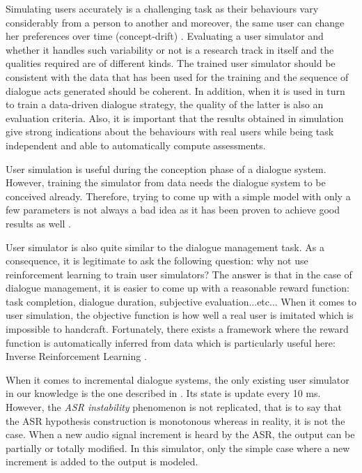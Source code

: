        	Simulating users accurately is a challenging task as their behaviours vary considerably from a person to another and moreover, the same user can change her preferences over time (concept-drift) \cite{Schatzmann2006}. Evaluating a user simulator and whether it handles such variability or not is a research track in itself \cite{Pietquin2013} and the qualities required are of different kinds. The trained user simulator should be consistent with the data that has been used for the training and the sequence of dialogue acts generated should be coherent. In addition, when it is used in turn to train a data-driven dialogue strategy, the quality of the latter is also an evaluation criteria. Also, it is important that the results obtained in simulation give strong indications about the behaviours with real users while being task independent and able to automatically compute assessments.
        
        User simulation is useful during the conception phase of a dialogue system. However, training the simulator from data needs the dialogue system to be conceived already. Therefore, trying to come up with a simple model with only a few parameters is not always a bad idea as it has been proven to achieve good results as well \cite{Schatzmann2007}.
        
        User simulator is also quite similar to the dialogue management task. As a consequence, it is legitimate to ask the following question: why not use reinforcement learning to train user simulators? The answer is that in the case of dialogue management, it is easier to come up with a reasonable reward function: task completion, dialogue duration, subjective evaluation...etc... When it comes to user simulation, the objective function is how well a real user is imitated which is impossible to handcraft. Fortunately, there exists a framework where the reward function is automatically inferred from data which is particularly useful here: Inverse Reinforcement Learning \cite{Chandramohan2011}.
        
        When it comes to incremental dialogue systems, the only existing user simulator in our knowledge is the one described in \cite{Selfridge2012b}. Its state is update every 10 ms. However, the \textit{ASR instability} phenomenon is not replicated, that is to say that the ASR hypothesis construction is monotonous whereas in reality, it is not the case. When a new audio signal increment is heard by the ASR, the output can be partially or totally modified. In this simulator, only the simple case where a new increment is added to the output is modeled.

